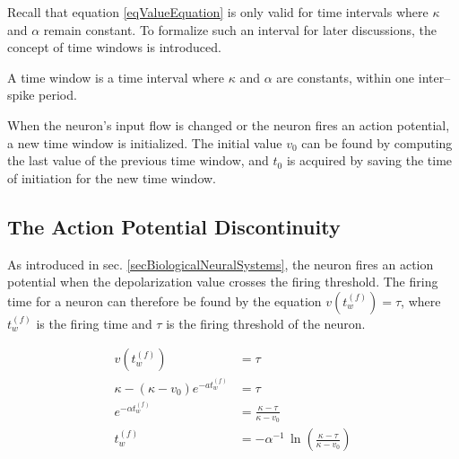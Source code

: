 		Recall that equation  \ref{eqValueEquation} is only valid for time intervals where $\kappa$ and $\alpha$ remain constant.
		To formalize such an interval for later discussions, the concept of time windows is introduced. %
		\begin{mydef}
			A time window is a time interval where $\kappa$ and $\alpha$ are constants, within one inter--spike period.
			\label{defTimeWindow}
		\end{mydef}

		When the neuron's input flow is changed or the neuron fires an action potential, a new time window is initialized.
		The initial value $v_0$ can be found by computing the last value of the previous time window, and $t_0$ is acquired by saving the time of initiation for the new time window. %



	\subsection{The Action Potential Discontinuity}
	\label{ssecTheActionPotential}
	As introduced in sec. \ref{secBiologicalNeuralSystems}, the neuron fires an action potential when the depolarization value crosses the firing threshold.
	The firing time for a neuron can therefore be found by the equation $v(t_w^{(f)}) = \tau$, where $t_w^{(f)}$ is the firing time and $\tau$ is the firing threshold of the neuron.

	\begin{equation}
		\begin{split}
				v\left(t_w^{(f)}\right)			 							&= \tau \qquad 										\\	%
				\kappa - \left( \kappa - v_0 \right) e^{-at_w^{(f)}}  		&= \tau 											\\
				e^{-\alpha t_w^{(f)}} 			 						&= \frac{\kappa - \tau}{\kappa - v_0} 					\\
				t_w^{(f)}													&= -\alpha^{-1} \, \ln \left( \frac{\kappa - \tau}{\kappa - v_0} \right) 					
		\end{split}
		\label{eqDevelopmentOfFiringTimeEstimateEq}
	\end{equation}

